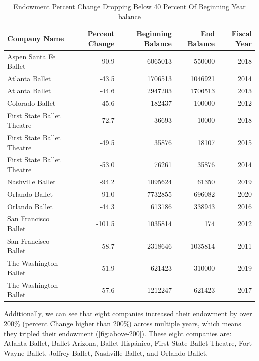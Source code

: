 \documentclass[Dance Data
Project,article,submit,moreauthors,pdftex]{mdpi}
\begin{document}
\begin{table}[!h]

\caption{Endowment Percent Change Dropping Below 40 Percent Of Beginning Year balance}
\centering
\begin{tabular}[t]{lrrrr}
\toprule
Company Name & Percent Change & Beginning Balance & End Balance & Fiscal Year\\
\midrule
Aspen Santa Fe Ballet & -90.9 & 6065013 & 550000 & 2018\\
\addlinespace
Atlanta Ballet & -43.5 & 1706513 & 1046921 & 2014\\
\addlinespace
Atlanta Ballet & -44.6 & 2947203 & 1706513 & 2013\\
\addlinespace
Colorado Ballet & -45.6 & 182437 & 100000 & 2012\\
\addlinespace
First State Ballet Theatre & -72.7 & 36693 & 10000 & 2018\\
\addlinespace
First State Ballet Theatre & -49.5 & 35876 & 18107 & 2015\\
\addlinespace
First State Ballet Theatre & -53.0 & 76261 & 35876 & 2014\\
\addlinespace
Nashville Ballet & -94.2 & 1095624 & 61350 & 2019\\
\addlinespace
Orlando Ballet & -91.0 & 7732855 & 696082 & 2020\\
\addlinespace
Orlando Ballet & -44.3 & 613186 & 338943 & 2016\\
\addlinespace
San Francisco Ballet & -101.5 & 1035814 & 174 & 2012\\
\addlinespace
San Francisco Ballet & -58.7 & 2318646 & 1035814 & 2011\\
\addlinespace
The Washington Ballet & -51.9 & 621423 & 310000 & 2019\\
\addlinespace
The Washington Ballet & -57.6 & 1212247 & 621423 & 2017\\
\bottomrule
\end{tabular}
\end{table}

Additionally, we can see that eight companies increased their endowment
by over 200\% (percent Change higher than 200\%) across multiple years,
which means they tripled their endowment (\ref{fig:above-200}). These
eight companies are: Atlanta Ballet, Ballet Arizona, Ballet Hispánico,
First State Ballet Theatre, Fort Wayne Ballet, Joffrey Ballet, Nashville
Ballet, and Orlando Ballet.
\end{document}
